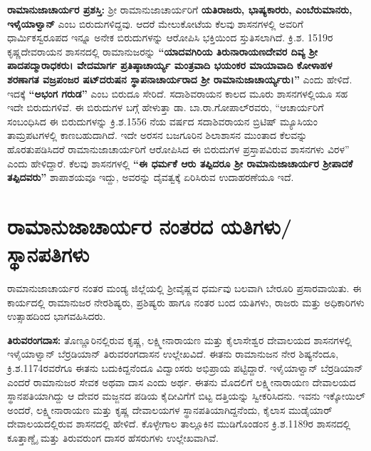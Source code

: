 \textbf{ರಾಮಾನುಜಾಚಾರ್ಯರ ಪ್ರಶಸ್ತಿ:} ಶ‍್ರೀ ರಾಮಾನುಜಾಚಾರ್ಯರಿಗೆ \textbf{ಯತಿರಾಜರು, ಭಾಷ್ಯಕಾರರು,\general{\break } ಎಂಬೆರುಮಾನರು, ಇಳೈಯಾಳ್ವಾನ್​} ಎಂಬ ಬಿರುದುಗಳಿದ್ದವು. ಆದರೆ ಮೇಲುಕೋಟೆಯ ಕೆಲವು ಶಾಸನಗಳಲ್ಲಿ ಅವರಿಗೆ ಧಾರ್ಮಿಕಸ್ವರೂಪದ ಇನ್ನೂ ಅನೇಕ ಬಿರುದುಗಳನ್ನು ಆರೋಪಿಸಿ ಭಕ್ತಿಯಿಂದ ಸ್ತುತಿಸಲಾಗಿದೆ. ಕ್ರಿ.ಶ. 1519ರ ಕೃಷ್ಣದೇವರಾಯನ ಶಾಸನದಲ್ಲಿ ರಾಮಾನುಜರನ್ನು \textbf{“ಯಾದವಗಿರಿಯ ತಿರುನಾರಾಯಣದೇವರ ದಿವ್ಯ ಶ‍್ರೀ ಪಾದಪದ್ಮಾರಾಧಕರು। ವೇದಮಾರ್ಗ ಪ್ರತಿಷ್ಠಾಚಾರ್ಯ್ಯ ಮಂತ್ರವಾದಿ ಭಯಂಕರ ಮಾಯಾವಾದಿ ಕೋಳಾಹಳ ಶರಣಾಗತ ವಜ್ರಪಂಜರ ಷಟ್​ದರುಷನ ಸ್ಥಾಪನಾಚಾರ್ಯರಾದ ಶ‍್ರೀ ರಾಮಾನುಜಾಚಾರ್ಯ್ಯರು।”} ಎಂದು ಹೇಳಿದೆ. ಇದಕ್ಕೆ \textbf{“ಅಭಂಗ ಗರುಡ”} ಎಂಬ ಬಿರುದೂ ಸೇರಿದೆ. ಸದಾಶಿವರಾಯನ ಕಾಲದ ಮೂರು ಶಾಸನಗಳಲ್ಲಿಯೂ ಸಹ ಇದೇ ಬಿರುದುಗಳಿವೆ. ಈ ಬಿರುದುಗಳ ಬಗ್ಗೆ ಹೇಳುತ್ತಾ ಡಾ. ಬಾ.ರಾ.ಗೋಪಾಲ್​ರವರು, “ಆಚಾರ್ಯರಿಗೆ ಸಂಬಂಧಿಸಿದ ಈ ಬಿರುದುಗಳನ್ನು ಕ್ರಿ.ಶ.1556 ನೆಯ ವರ್ಷದ ಸದಾಶಿವರಾಯನ ಬ್ರಿಟಿಷ್​ ಮ್ಯೂಸಿಯಂ ತಾಮ್ರಪಟಗಳಲ್ಲಿ ಕಾಣಬಹುದಾಗಿದೆ. ಇದೇ ಅರಸನ ಬಜಗೂರಿನ ಶಿಲಾಶಾಸನ ಮುಂತಾದ ಕೆಲವನ್ನು ಹೊರತುಪಡಿಸಿದರೆ ರಾಮಾನುಜಾಚಾರ್ಯರಿಗೆ ಆರೋಪಿಸಿದ ಈ ಬಿರುದುಗಳ ಪ್ರಸ್ತಾಪವಿರುವ ಶಾಸನಗಳು ವಿರಳ” ಎಂದು ಹೇಳಿದ್ದಾರೆ. ಕೆಲವು ಶಾಸನಗಳಲ್ಲಿ \textbf{“ಈ ಧರ್ಮಕೆ ಆರು ತಪ್ಪಿದರೂ ಶ‍್ರೀ ರಾಮಾನುಜಾಚಾರ್ಯರ ಶ‍್ರೀಪಾದಕೆ ತಪ್ಪಿದವರು” } ಶಾಪಾಶಯವೂ ಇದ್ದು, ಅವರನ್ನು ದೈವತ್ವಕ್ಕೆ ಏರಿಸಿರುವ ಉದಾಹರಣೆಯೂ ಇದೆ.

\section*{ರಾಮಾನುಜಾಚಾರ್ಯರ ನಂತರದ ಯತಿಗಳು/ ಸ್ಥಾನಪತಿಗಳು}

ರಾಮಾನುಜಾಚಾರ್ಯರ ನಂತರ ಮಂಡ್ಯ ಜಿಲ್ಲೆಯಲ್ಲಿ ಶ‍್ರೀವೈಷ್ಣವ ಧರ್ಮವು ಬಲವಾಗಿ ಬೇರೂರಿ ಪ್ರಸಾರವಾಯಿತು. ಈ ಕಾರ್ಯದಲ್ಲಿ ರಾಮಾನುಜರ ನೇರಶಿಷ್ಯರು, ಪ್ರಶಿಷ್ಯರು ಹಾಗೂ ನಂತರ ಬಂದ ಯತಿಗಳು, ರಾಜರು ಮತ್ತು ಅಧಿಕಾರಿಗಳು ಉತ್ಸಾಹದಿಂದ ಭಾಗವಹಿಸಿದರು.

\textbf{ತಿರುವರಂಗದಾಸ:} ತೊಣ್ಣೂರಿನಲ್ಲಿರುವ ಕೃಷ್ಣ, ಲಕ್ಷ್ಮೀನಾರಾಯಣ ಮತ್ತು ಕೈಲಾಸೇಶ್ವರ ದೇವಾಲಯದ ಶಾಸನಗಳಲ್ಲಿ ಇಳೈಯಾಳ್ವಾನ್​ ಬೆರ್ರಡಿಯಾನ್​ ತಿರುವರಂಗದಾಸನ ಉಲ್ಲೇಖವಿದೆ. ಈತನು ರಾಮಾನುಜನ ನೇರ ಶಿಷ್ಯನೆಂದೂ, ಕ್ರಿ.ಶ.1174\-ರವರೆಗೂ ಈತನು ಬದುಕಿದ್ದನೆಂದೂ ವಿದ್ವಾಂಸರು ಅಭಿಪ್ರಾಯ ಪಟ್ಟಿದ್ದಾರೆ. ಇಳೈಯಾಳ್ವಾನ್​ ಬೆರ್ರಡಿಯಾನ್​ ಎಂದರೆ ರಾಮಾನುಜರ ಸೇವಕ ಅಥವಾ ದಾಸ ಎಂದು ಅರ್ಥ. ಈತನು ಮೊದಲಿಗೆ ಲಕ್ಷ್ಮೀನಾರಾಯಣ ದೇವಾಲಯದ ಸ್ಥಾನಪತಿಯಾಗಿದ್ದು ಆ ದೇವರ ಮಜ್ಜನದ ಪಡಿಯ ಕೈದೀವಿಗೆಗೆ ಬಿಟ್ಟ ದತ್ತಿಯನ್ನು ಸ್ವೀಕರಿಸಿದನು. ಇವನು ಇಕ್ಕೋಯಿಲ್​ ಅಂದರೆ, ಲಕ್ಷ್ಮೀನಾರಾಯಣ ಮತ್ತು ಕೃಷ್ಣ ದೇವಾಲಯಗಳ ಸ್ಥಾನಪತಿಯಾಗಿದ್ದನೆಂದು, ಕೈಲಾಸ ಮುಡೈಯಾರ್​ ದೇವಾಲಯ\-ದಲ್ಲಿರುವ ಶಾಸನದಲ್ಲಿ ಹೇಳಿದೆ. ಕೊಳ್ಳೇಗಾಲ ತಾಲ್ಲೂಕಿನ ಮುಡಿಗೊಂಡಂನ ಕ್ರಿ.ಶ.1189ರ ಶಾಸನದಲ್ಲಿ ಕೂತ್ತಾಣ್ಡೈ ಮತ್ತು ತಿರುವರುಂಗ ದಾಸರ ಹೆಸರುಗಳು ಉಲ್ಲೇಖವಾಗಿವೆ.

